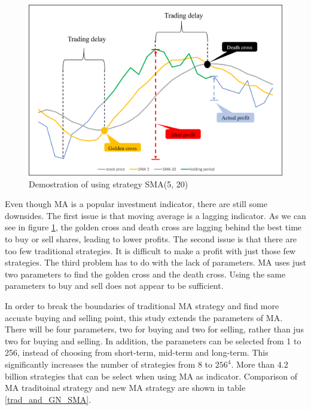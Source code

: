 \documentclass[../main.tex]{subfiles}
\begin{document}
\begin{figure}[H]
    \centering
    \includegraphics[scale = 0.6] {figure/cross1.png}
    \caption{Demostration of using strategy SMA(5, 20)}
    \label{cross_demo}
\end{figure}

Even though MA is a popular investment indicator, there are still some downsides. The first issue is that moving average is a lagging indicator. As we can see in figure \ref{cross_demo}, the golden cross and death cross are lagging behind the best time to buy or sell shares, leading to lower profits. The second issue is that there are too few traditional strategies. It is difficult to make a profit with just those few strategies. The third problem has to do with the lack of parameters. MA uses just two parameters to find the golden cross and the death cross. Using the same parameters to buy and sell does not appear to be sufficient.

\bigbreak

In order to break the boundaries of traditional MA strategy and find more accuate buying and selling point, this study extends the parameters of MA. There will be four parameters, two for buying and two for selling, rather than jus two for buying and selling. In addition, the parameters can be selected from 1 to 256, instead of choosing from short-term, mid-term and long-term.
This significantly increases the number of strategies from 8 to $\text{256}^\text{4}$. More than 4.2 billion strategies that can be select when using MA as indicator. Comparison of MA traditoinal strategy and new MA strategy are shown in table \ref{trad_and_GN_SMA}.
\end{document}
